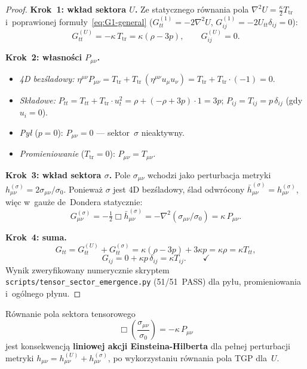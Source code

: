\begin{proof}
\textbf{Krok~1: wk\l{}ad sektora $U$.}
Ze statycznego r\'ownania pola
$\nabla^2 U = \tfrac{\kappa}{2}T_{\mathrm{tr}}$
i~poprawionej formu\l{}y~\eqref{eq:G1-general} ($G^{(1)}_{tt}=-2\nabla^2 U$,
$G^{(1)}_{ij}=-2U_{tt}\delta_{ij}=0$):
\[
  G^{(U)}_{tt} = -\kappa\,T_{\mathrm{tr}} = \kappa(\rho-3p),\qquad
  G^{(U)}_{ij} = 0.
\]

\textbf{Krok~2: w\l{}asno\'sci $P_{\mu\nu}$.}
\begin{itemize}[nosep]
  \item \emph{4D bezśladowy:}
    $\eta^{\mu\nu}P_{\mu\nu}
    = T_{\mathrm{tr}} + T_{\mathrm{tr}}\,(\eta^{\mu\nu}u_\mu u_\nu)
    = T_{\mathrm{tr}} + T_{\mathrm{tr}}\cdot(-1) = 0$. \checkmark
  \item \emph{Sk\l{}adowe:}
    $P_{tt} = T_{tt} + T_{\mathrm{tr}}\cdot u_t^2
           = \rho + (-\rho+3p)\cdot 1 = 3p$;\quad
    $P_{ij} = T_{ij} = p\,\delta_{ij}$ (gdy $u_i=0$).
  \item \emph{Pył} ($p=0$): $P_{\mu\nu}=0$ --- sektor~$\sigma$ nieaktywny. \checkmark
  \item \emph{Promieniowanie} ($T_{\mathrm{tr}}=0$): $P_{\mu\nu}=T_{\mu\nu}$. \checkmark
\end{itemize}

\textbf{Krok~3: wk\l{}ad sektora $\sigma$.}
Pole $\sigma_{\mu\nu}$ wchodzi jako perturbacja metryki
$h^{(\sigma)}_{\mu\nu} = 2\sigma_{\mu\nu}/\sigma_0$.
Poniewa\.z $\sigma$ jest 4D bezśladowy, \'slad odwr\'ocony
$\bar h^{(\sigma)}_{\mu\nu} = h^{(\sigma)}_{\mu\nu}$,
wi\k{e}c w~gau\.ze de~Dondera statycznie:
\[
  G^{(\sigma)}_{\mu\nu}
  = -\tfrac{1}{2}\Box\bar h^{(\sigma)}_{\mu\nu}
  = -\nabla^2(\sigma_{\mu\nu}/\sigma_0)
  = \kappa\,P_{\mu\nu}.
\]

\textbf{Krok~4: suma.}
\[
  G_{tt} = G^{(U)}_{tt} + G^{(\sigma)}_{tt}
         = \kappa(\rho-3p) + 3\kappa p = \kappa\rho = \kappa T_{tt},
\]
\[
  G_{ij} = 0 + \kappa p\,\delta_{ij} = \kappa T_{ij}. \qquad\checkmark
\]
Wynik zweryfikowany numerycznie skryptem
\texttt{scripts/tensor\_sector\_emergence.py} (51/51~PASS)
dla py\l{}u, promieniowania i~og\'olnego p\l{}ynu.
\end{proof}

\begin{proposition}%
\label{prop:sigma-action}
R\'ownanie pola sektora tensorowego
\begin{equation}\label{eq:sigma-field-eq}
  \Box\!\left(\frac{\sigma_{\mu\nu}}{\sigma_0}\right) = -\kappa\,P_{\mu\nu}
\end{equation}
jest konsekwencj\k{a} \textbf{liniowej akcji Einsteina-Hilberta}
dla pe\l{}nej perturbacji metryki
$h_{\mu\nu} = h^{(U)}_{\mu\nu} + h^{(\sigma)}_{\mu\nu}$,
po wykorzy\-staniu r\'ownania pola TGP dla~$U$.
\end{proposition}

